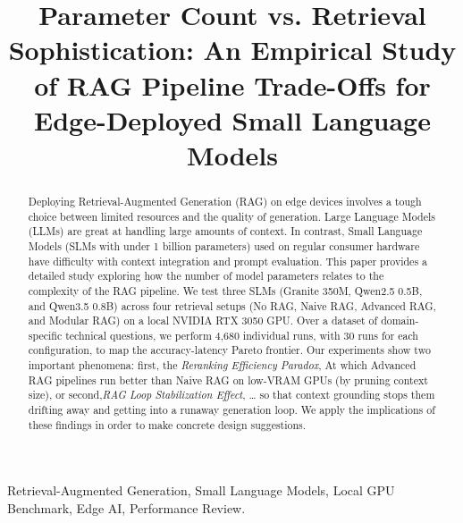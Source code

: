 \documentclass[conference]{IEEEtran}
\begin{document}
\title{Parameter Count vs. Retrieval Sophistication: An Empirical Study of RAG Pipeline Trade-Offs for Edge-Deployed Small Language Models}
\author{
\and
{}
}
\maketitle
\begin{abstract}
Deploying Retrieval-Augmented Generation (RAG) on edge devices involves a tough choice between limited resources and the quality of generation. Large Language Models (LLMs) are great at handling large amounts of context. In contrast, Small Language Models (SLMs with under 1 billion parameters) used on regular consumer hardware have difficulty with context integration and prompt evaluation. This paper provides a detailed study exploring how the number of model parameters relates to the complexity of the RAG pipeline. We test three SLMs (Granite 350M, Qwen2.5 0.5B, and Qwen3.5 0.8B) across four retrieval setups (No RAG, Naive RAG, Advanced RAG, and Modular RAG) on a local NVIDIA RTX 3050 GPU. Over a dataset of domain-specific technical questions, we perform 4,680 individual runs, with 30 runs for each configuration, to map the accuracy-latency Pareto frontier. Our experiments show two important phenomena: first, the \textit{Reranking Efficiency Paradox}, At which Advanced RAG pipelines run better than Naive RAG on low-VRAM GPUs (by pruning context size), or second,\textit{RAG Loop Stabilization Effect}, … so that context grounding stops them drifting away and getting into a runaway generation loop. We apply the implications of these findings in order to make concrete design suggestions.
\end{abstract}
\begin{IEEEkeywords}
Retrieval-Augmented Generation, Small Language Models, Local GPU Benchmark, Edge AI, Performance Review.
\end{IEEEkeywords}
\end{document}
